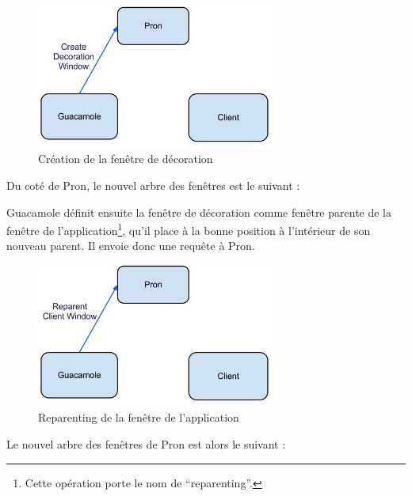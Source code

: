 \begin{figure}[H]
  \centering
  \includegraphics[width=8cm]{images/Guacamole_anim_4.jpg}
  \caption{Création de la fenêtre de décoration}
  \label{fig:guacamole_anim_4}
\end{figure}

Du coté de Pron, le nouvel arbre des fenêtres est le suivant :

\begin{center}
\end{center}

Guacamole définit ensuite la fenêtre de décoration comme fenêtre parente de la fenêtre de l'application\footnote{Cette opération porte le nom de ``reparenting''.}, qu'il place à la bonne position à l'intérieur de son nouveau parent.
Il envoie donc une requête à Pron.

\begin{figure}[H]
  \centering
  \includegraphics[width=8cm]{images/Guacamole_anim_5.jpg}
  \caption{Reparenting de la fenêtre de l'application}
  \label{fig:guacamole_anim_5}
\end{figure}

Le nouvel arbre des fenêtres de Pron est alors le suivant :

